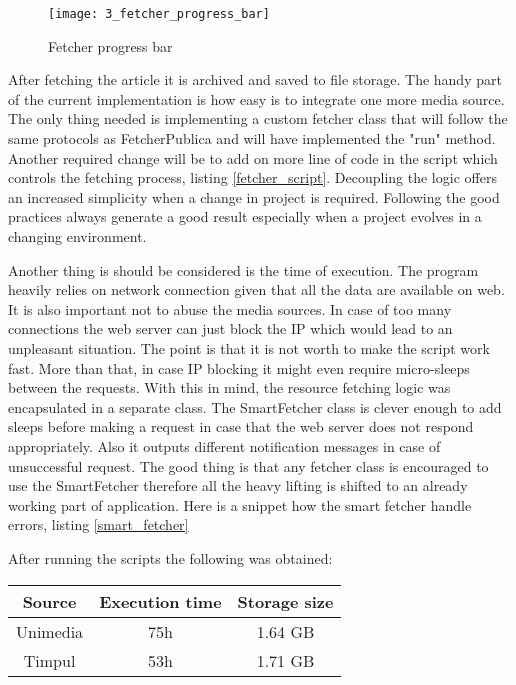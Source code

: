 \begin{figure}[!ht]
\centering
\texttt{[image: 3\_fetcher\_progress\_bar]}
\caption{Fetcher progress bar}\label{fetcher_progress_bar}
\end{figure}

After fetching the article it is archived and saved to file storage. The handy part of the current implementation is how easy is to integrate one more media source. The only thing needed is implementing a custom fetcher class that will follow the same protocols as FetcherPublica and will have implemented the "run" method. Another required change will be to add on more line of code in the script which controls the fetching process, listing \ref{fetcher_script}. Decoupling the logic offers an increased simplicity when a change in project is required. Following the good practices always generate a good result especially when a project evolves in a changing environment.





Another thing is should be considered is the time of execution. The program heavily relies on network connection given that all the data are available on web. It is also important not to abuse the media sources. In case of too many connections the web server can just block the IP which would lead to an unpleasant situation. The point is that it is not worth to make the script work fast. More than that, in case IP blocking it might even require micro-sleeps between the requests. With this in mind, the resource fetching logic was encapsulated in a separate class. The SmartFetcher class is clever enough to add sleeps before making a request in case that the web server does not respond appropriately. Also it outputs different notification messages in case of unsuccessful request. The good thing is that any fetcher class is encouraged to use the SmartFetcher therefore all the heavy lifting is shifted to an already working part of application. Here is a snippet how the smart fetcher handle errors, listing \ref{smart_fetcher}



After running the scripts the following was obtained:
\begin{center}
 \begin{tabular}{|c c c |}
 \hline
 Source & Execution time & Storage size \\ [0.5ex] 
 \hline
 Unimedia & 75h & 1.64 GB \\
 \hline
 Timpul & 53h & 1.71 GB \\
 \hline
\end{tabular}
\end{center}

